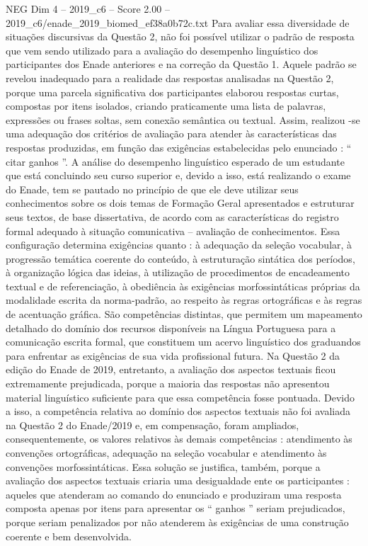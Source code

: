 \begin{textsample}{NEG Dim 4 – 2019\_c6 – Score 2.00 – 2019\_c6/enade\_2019\_biomed\_ef38a0b72c.txt}
Para avaliar essa diversidade de situações discursivas da Questão 2, não foi possível utilizar o padrão de resposta que vem sendo utilizado para a avaliação do desempenho linguístico dos participantes dos Enade anteriores e na correção da Questão 1.
Aquele padrão se revelou inadequado para a realidade das respostas analisadas na Questão 2, porque uma parcela significativa dos participantes elaborou respostas curtas, compostas por itens isolados, criando praticamente uma lista de palavras, expressões ou frases soltas, sem conexão semântica ou textual.
Assim, realizou -se uma adequação dos critérios de avaliação para atender às características das respostas produzidas, em função das exigências estabelecidas pelo enunciado : “ citar ganhos ”.
A análise do desempenho linguístico esperado de um estudante que está concluindo seu curso superior e, devido a isso, está realizando o exame do Enade, tem se pautado no princípio de que ele deve utilizar seus conhecimentos sobre os dois temas de Formação Geral apresentados e estruturar seus textos, de base dissertativa, de acordo com as características do registro formal adequado à situação comunicativa – avaliação de conhecimentos.
Essa configuração determina exigências quanto : à adequação da seleção vocabular, à progressão temática coerente do conteúdo, à estruturação sintática dos períodos, à organização lógica das ideias, à utilização de procedimentos de encadeamento textual e de referenciação, à obediência às exigências morfossintáticas próprias da modalidade escrita da norma-padrão, ao respeito às regras ortográficas e às regras de acentuação gráfica.
São competências distintas, que permitem um mapeamento detalhado do domínio dos recursos disponíveis na Língua Portuguesa para a comunicação escrita formal, que constituem um acervo linguístico dos graduandos para enfrentar as exigências de sua vida profissional futura.
Na Questão 2 da edição do Enade de 2019, entretanto, a avaliação dos aspectos textuais ficou extremamente prejudicada, porque a maioria das respostas não apresentou material linguístico suficiente para que essa competência fosse pontuada.
Devido a isso, a competência relativa ao domínio dos aspectos textuais não foi avaliada na Questão 2 do Enade/2019 e, em compensação, foram ampliados, consequentemente, os valores relativos às demais competências : atendimento às convenções ortográficas, adequação na seleção vocabular e atendimento às convenções morfossintáticas.
Essa solução se justifica, também, porque a avaliação dos aspectos textuais criaria uma desigualdade ente os participantes : aqueles que atenderam ao comando do enunciado e produziram uma resposta composta apenas por itens para apresentar os “ ganhos ” seriam prejudicados, porque seriam penalizados por não atenderem às exigências de uma construção coerente e bem desenvolvida.

\end{textsample}
